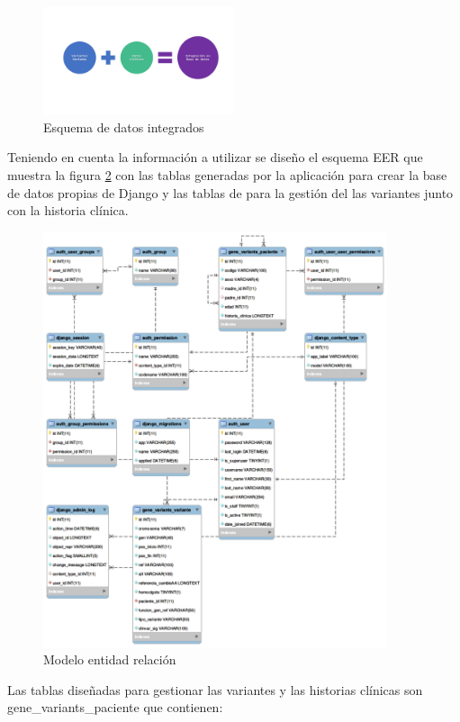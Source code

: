 \begin{figure}[h!] 
	\centering
	\includegraphics[width=0.5\textwidth]{Kap3/flujo2}
	\caption{Esquema de datos integrados} 
	\label{fig:flujo2}
\end{figure}

Teniendo en cuenta la información a utilizar se diseño el esquema EER  que muestra la figura \ref{fig:t} con las tablas generadas por la aplicación para crear la base de datos propias de Django y las tablas de para la gestión del las variantes junto con la historia clínica.

\begin{figure}[H]
	\centering
	\includegraphics[width=0.9\textwidth]{Kap3/modeloEER}
	\caption{Modelo entidad relación} \label{fig:t}
\end{figure}

Las tablas diseñadas para gestionar las variantes y las historias clínicas son gene\_variants\_paciente que contienen:

